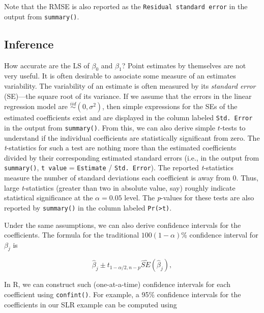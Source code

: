 \documentclass[]{krantz}
\begin{document}
Note that the RMSE is also reported as the \texttt{Residual\ standard\ error} in the output from \texttt{summary()}.

\hypertarget{inference}{%
\subsection{Inference}\label{inference}}

How accurate are the LS of \(\beta_0\) and \(\beta_1\)? Point estimates by themselves are not very useful. It is often desirable to associate some measure of an estimates variability. The variability of an estimate is often measured by its \emph{standard error} (SE)---the square root of its variance. If we assume that the errors in the linear regression model are \(\stackrel{iid}{\sim} \left(0, \sigma^2\right)\), then simple expressions for the SEs of the estimated coefficients exist and are displayed in the column labeled \texttt{Std.\ Error} in the output from \texttt{summary()}. From this, we can also derive simple \(t\)-tests to understand if the individual coefficients are statistically significant from zero. The \emph{t}-statistics for such a test are nothing more than the estimated coefficients divided by their corresponding estimated standard errors (i.e., in the output from \texttt{summary()}, \texttt{t\ value} = \texttt{Estimate} / \texttt{Std.\ Error}). The reported \emph{t}-statistics measure the number of standard deviations each coefficient is away from 0. Thus, large \emph{t}-statistics (greater than two in absolute value, say) roughly indicate statistical significance at the \(\alpha = 0.05\) level. The \emph{p}-values for these tests are also reported by \texttt{summary()} in the column labeled \texttt{Pr(\textgreater{}\textbar{}t\textbar{})}.

Under the same assumptions, we can also derive confidence intervals for the coefficients. The formula for the traditional \(100\left(1 - \alpha\right)\)\% confidence interval for \(\beta_j\) is

\begin{equation}
  \widehat{\beta}_j \pm t_{1 - \alpha / 2, n - p} \widehat{SE}\left(\widehat{\beta}_j\right),
  \label{eq:conf-int}
\end{equation}

In R, we can construct such (one-at-a-time) confidence intervals for each coefficient using \texttt{confint()}. For example, a 95\% confidence intervals for the coefficients in our SLR example can be computed using
\end{document}

